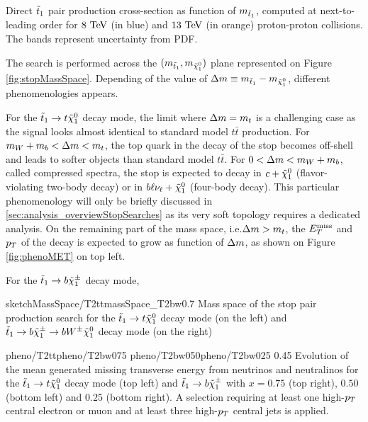         {Direct $\tilde{t}_1$ pair production cross-section as function of $m_{\tilde{t}_1}$, computed at next-to-leading order
        for $8~\text{TeV}$ (in blue) and $13~\text{TeV}$ (in orange) proton-proton collisions. The bands represent uncertainty from PDF.}

        The search is performed across the $(m_{\tilde{t}_1},m_{\tilde{\chi}_1^0})$ plane 
        represented on Figure \ref{fig:stopMassSpace}. Depending of the value of 
        $\Delta m \equiv m_{\tilde{t}_1} - m_{\tilde{\chi}_1^0}$, different phenomenologies 
        appears. 
        
        For the $\tilde{t}_1 \rightarrow t \tilde{\chi}_1^0$ decay mode, the limit where
        $\Delta m = m_{t}$ is a challenging case as the signal looks almost identical
        to standard model $t\bar{t}$ production. For $m_{W} + m_{b} < \Delta m < m_{t}$,
        the top quark in the decay of the stop becomes off-shell and leads to softer objects
        than standard model $t\bar{t}$. For $0 < \Delta m < m_{W} + m_{b}$, called
        compressed spectra, the stop is expected to decay in $c+\tilde{\chi}_1^0$ 
        (flavor-violating two-body decay) or in $b\ell\nu_\ell+\tilde{\chi}_1^0$ (four-body 
        decay). This particular phenomenology will only be briefly discussed in 
        \ref{sec:analysis_overviewStopSearches} as its very soft topology requires a 
        dedicated analysis. On the remaining part of the mass space, i.e.$\Delta m > m_{t}$,
        the $E_T^\text{miss}$ and $p_T$ of the decay is expected to grow as function of $\Delta m$,
        as shown on Figure \ref{fig:phenoMET} on top left. 

        For the $\tilde{t}_1 \rightarrow b \tilde{\chi}_1^\pm$ decay mode, 

                     {sketchMassSpace/T2tt}{massSpace_T2bw}{0.7}
                     {Mass space of the stop pair production search for the $\tilde{t}_1 
                     \rightarrow t \tilde{\chi}_1^0$ decay mode (on the left) and $\tilde{t}_1 
                     \rightarrow b \tilde{\chi}_1^\pm \rightarrow b W^{\pm} \tilde{\chi}_1^0 $ decay 
                     mode (on the right) }
 
                     {pheno/T2tt}{pheno/T2bw075}
                     {pheno/T2bw050}{pheno/T2bw025}
                     {0.45}
                     {Evolution of the mean generated missing transverse energy from neutrinos
                     and neutralinos for the $\tilde{t}_1 \rightarrow t \tilde{\chi}_1^0$ 
                     decay mode (top left) and $\tilde{t}_1 \rightarrow b \tilde{\chi}_1^\pm$ with 
                     $x = 0.75$ (top right), $0.50$ (bottom left) and $0.25$ (bottom right). 
                     A selection requiring at least one high-$p_T$ central 
                     electron or muon and at least three high-$p_T$ central jets is applied.}

